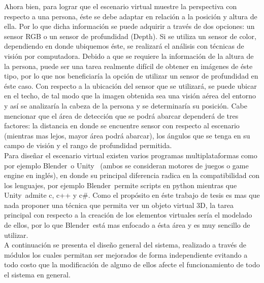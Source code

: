\documentclass[a4paper,openright,12pt]{report}
\begin{document}
Ahora bien, para lograr que el escenario virtual muestre la perspectiva con respecto a una persona, éste se debe adaptar en relación a la posición y altura de ella. Por lo que dicha información se puede adquirir a través de dos opciones: un sensor RGB o un sensor de profundidad (Depth). Si se utiliza un sensor de color, dependiendo en donde ubiquemos éste, se realizará el análisis con técnicas de visión por computadora. Debido a que se requiere la información de la altura de la persona, puede ser una tarea realmente difícil de obtener en imágenes de éste tipo, por lo que nos beneficiaría la opción de utilizar un sensor de profundidad en éste caso. Con respecto a la ubicación del sensor que se utilizará, se puede ubicar en el techo, de tal modo que la imagen obtenida sea una visión aérea del entorno y así se analizaría la cabeza de la persona y se determinaría su posición. Cabe mencionar que el área de detección que se podrá abarcar dependerá de tres factores: la distancia en donde se encuentre sensor con respecto al escenario (mientras mas lejos, mayor área podrá abarcar), los ángulos que se tenga en su campo de visión y el rango de profundidad permitida.\\
Para diseñar el escenario virtual existen varios programas multiplataformas como por ejemplo Blender\textcopyright\ o Unity \textcopyright\  (ambos se consideran motores de juegos o game engine en inglés), en donde su principal diferencia radica en la compatibilidad con los lenguajes, por ejemplo Blender\textcopyright\ permite scripts en python mientras que Unity\textcopyright\ admite c, c++ y c\#. Como el propósito en éste trabajo de tesis es mas que nada proponer una técnica que permita ver un objeto virtual 3D, la tarea principal con respecto a la creación de los elementos virtuales sería el modelado de ellos, por lo que Blender\textcopyright\ está mas enfocado a ésta área y es muy sencillo de utilizar.\\
A continuación se presenta el diseño general del sistema, realizado a través de módulos los cuales permitan ser mejorados de forma independiente evitando a todo costo que la modificación de alguno de ellos afecte el funcionamiento de todo el sistema en general.\\
\end{document}
